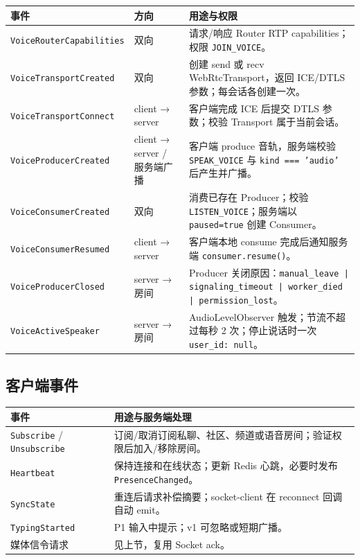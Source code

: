 \noindent\begin{tabularx}{\textwidth}{L{4.8cm}L{2cm}Y}
  \toprule
  事件 & 方向 & 用途与权限 \\
  \midrule
  \texttt{VoiceRouterCapabilities} & 双向 & 请求/响应 Router RTP capabilities；权限 \texttt{JOIN\_VOICE}。 \\
  \texttt{VoiceTransportCreated} & 双向 & 创建 send 或 recv WebRtcTransport，返回 ICE/DTLS 参数；每会话各创建一次。 \\
  \texttt{VoiceTransportConnect} & client → server & 客户端完成 ICE 后提交 DTLS 参数；校验 Transport 属于当前会话。 \\
  \texttt{VoiceProducerCreated} & client → server / 服务端广播 & 客户端 produce 音轨，服务端校验 \texttt{SPEAK\_VOICE} 与 \texttt{kind === 'audio'} 后产生并广播。 \\
  \texttt{VoiceConsumerCreated} & 双向 & 消费已存在 Producer；校验 \texttt{LISTEN\_VOICE}；服务端以 \texttt{paused=true} 创建 Consumer。 \\
  \texttt{VoiceConsumerResumed} & client → server & 客户端本地 consume 完成后通知服务端 \texttt{consumer.resume()}。 \\
  \texttt{VoiceProducerClosed} & server → 房间 & Producer 关闭原因：\texttt{manual\_leave | signaling\_timeout | worker\_died | permission\_lost}。 \\
  \texttt{VoiceActiveSpeaker} & server → 房间 & AudioLevelObserver 触发；节流不超过每秒 2 次；停止说话时一次 \texttt{user\_id: null}。 \\
  \bottomrule
\end{tabularx}

\subsection{客户端事件}

\noindent\begin{tabularx}{\textwidth}{L{3cm}Y}
  \toprule
  事件 & 用途与服务端处理 \\
  \midrule
  \texttt{Subscribe} / \texttt{Unsubscribe} & 订阅/取消订阅私聊、社区、频道或语音房间；验证权限后加入/移除房间。 \\
  \texttt{Heartbeat} & 保持连接和在线状态；更新 Redis 心跳，必要时发布 \texttt{PresenceChanged}。 \\
  \texttt{SyncState} & 重连后请求补偿摘要；socket-client 在 reconnect 回调自动 emit。 \\
  \texttt{TypingStarted} & P1 输入中提示；v1 可忽略或短期广播。 \\
  媒体信令请求 & 见上节，复用 Socket ack。 \\
  \bottomrule
\end{tabularx}

